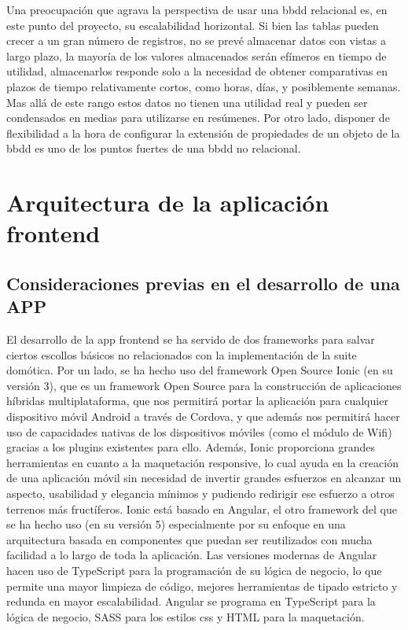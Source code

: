 \vspace{1cm}

Una preocupación que agrava la perspectiva de usar una \gls{bbdd} relacional es, en este punto del proyecto, su escalabilidad horizontal. Si bien las tablas pueden crecer a un gran número de registros, no se prevé almacenar datos con vistas a largo plazo, la mayoría de los valores almacenados serán efímeros en tiempo de utilidad, almacenarlos responde solo a la necesidad de obtener comparativas en plazos de tiempo relativamente cortos, como horas, días, y posiblemente semanas. Mas allá de este rango estos datos no tienen una utilidad real y pueden ser condensados en medias para utilizarse en resúmenes. Por otro lado, disponer de flexibilidad a la hora de configurar la extensión de propiedades de un objeto de la \gls{bbdd} es uno de los puntos fuertes de una \gls{bbdd} no relacional.


\section{Arquitectura de la aplicación frontend}
\label{ch:Capitulo4.6}

\subsection{Consideraciones previas en el desarrollo de una APP}
\label{c:Capitulo4.6.1}

El desarrollo de la app frontend se ha servido de dos frameworks para salvar ciertos escollos básicos no relacionados con la implementación de la suite domótica. Por un lado, se ha hecho uso del framework Open Source Ionic (en su versión 3), que es un framework Open Source para la construcción de aplicaciones híbridas multiplataforma, que nos permitirá portar la aplicación para cualquier dispositivo móvil Android a través de Cordova, y que además nos permitirá hacer uso de capacidades nativas de los dispositivos móviles (como el módulo de Wifi) gracias a los plugins existentes para ello. Además, Ionic proporciona grandes herramientas en cuanto a la maquetación responsive, lo cual ayuda en la creación de una aplicación móvil sin necesidad de invertir grandes esfuerzos en alcanzar un aspecto, usabilidad y elegancia mínimos y pudiendo redirigir ese esfuerzo a otros terrenos más fructíferos. Ionic está basado en Angular, el otro framework del que se ha hecho uso (en su versión 5) especialmente por su enfoque en una arquitectura basada en componentes que puedan ser reutilizados con mucha facilidad a lo largo de toda la aplicación. Las versiones modernas de Angular hacen uso de TypeScript para la programación de su lógica de negocio, lo que permite una mayor limpieza de código, mejores herramientas de tipado estricto y redunda en mayor escalabilidad. Angular se programa en TypeScript para la lógica de negocio, SASS para los estilos css y HTML para la maquetación.


